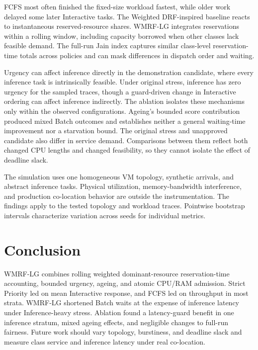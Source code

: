 \documentclass[conference]{IEEEtran}
\newcommand{\wmrf}{WMRF-LG}
\newcommand{\wdrf}{Weighted DRF-inspired}
\begin{document}
FCFS most often finished the fixed-size workload fastest, while older work delayed some later Interactive tasks. The \wdrf{} baseline reacts to instantaneous reserved-resource shares. \wmrf{} integrates reservations within a rolling window, including capacity borrowed when other classes lack feasible demand. The full-run Jain index captures similar class-level reservation-time totals across policies and can mask differences in dispatch order and waiting.

Urgency can affect inference directly in the demonstration candidate, where every inference task is intrinsically feasible. Under original stress, inference has zero urgency for the sampled traces, though a guard-driven change in Interactive ordering can affect inference indirectly. The ablation isolates these mechanisms only within the observed configurations. Ageing's bounded score contribution produced mixed Batch outcomes and establishes neither a general waiting-time improvement nor a starvation bound. The original stress and unapproved candidate also differ in service demand. Comparisons between them reflect both changed CPU lengths and changed feasibility, so they cannot isolate the effect of deadline slack.

The simulation uses one homogeneous VM topology, synthetic arrivals, and abstract inference tasks. Physical utilization, memory-bandwidth interference, and production co-location behavior are outside the instrumentation. The findings apply to the tested topology and workload traces. Pointwise bootstrap intervals characterize variation across seeds for individual metrics.

\section{Conclusion}
\wmrf{} combines rolling weighted dominant-resource reservation-time accounting, bounded urgency, ageing, and atomic CPU/RAM admission. Strict Priority led on mean Interactive response, and FCFS led on throughput in most strata. \wmrf{} shortened Batch waits at the expense of inference latency under Inference-heavy stress. Ablation found a latency-guard benefit in one inference stratum, mixed ageing effects, and negligible changes to full-run fairness. Future work should vary topology, burstiness, and deadline slack and measure class service and inference latency under real co-location.



\end{document}
